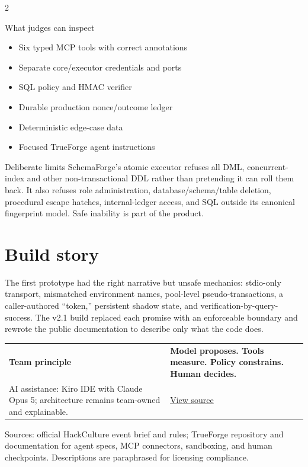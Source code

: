 \documentclass[10pt]{article}
\begin{document}
\begin{multicols}{2}
\begin{accentcard}{What judges can inspect}
\begin{itemize}
  \item Six typed MCP tools with correct annotations
  \item Separate core/executor credentials and ports
  \item SQL policy and HMAC verifier
  \item Durable production nonce/outcome ledger
  \item Deterministic edge-case data
  \item Focused TrueForge agent instructions
\end{itemize}
\end{accentcard}

\begin{card}{Deliberate limits}
SchemaForge's atomic executor refuses all DML, concurrent-index and other non-transactional DDL rather than pretending it can roll them back. It also refuses role administration, database/schema/table deletion, procedural escape hatches, internal-ledger access, and SQL outside its canonical fingerprint model. Safe inability is part of the product.
\end{card}
\end{multicols}

\section*{Build story}
The first prototype had the right narrative but unsafe mechanics: stdio-only transport, mismatched environment names, pool-level pseudo-transactions, a caller-authored ``token,'' persistent shadow state, and verification-by-query-success. The v2.1 build replaced each promise with an enforceable boundary and rewrote the public documentation to describe only what the code does.

\vfill
\begin{tabularx}{\textwidth}{X >{\raggedleft\arraybackslash}X}
\textbf{Team principle} & \textbf{Model proposes. Tools measure. Policy constrains. Human decides.}\\
\textcolor{Slate}{AI assistance: Kiro IDE with Claude Opus 5; architecture remains team-owned and explainable.} & \href{https://github.com/harshaxyZ/schemaforge}{View source}\\
\end{tabularx}

\vspace{2mm}
{\scriptsize\textcolor{Slate}{Sources: official HackCulture event brief and rules; TrueForge repository and documentation for agent specs, MCP connectors, sandboxing, and human checkpoints. Descriptions are paraphrased for licensing compliance.}}
\end{document}
